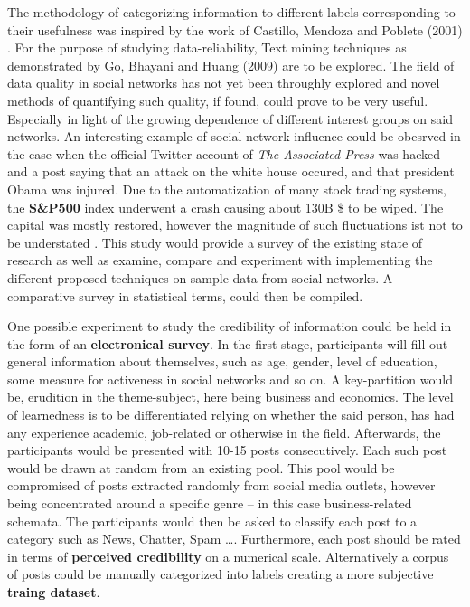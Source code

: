 \documentclass[12pt]{article}
\begin{document}
The methodology of categorizing information to different labels corresponding to their usefulness was inspired by the work of Castillo, Mendoza and Poblete (2001)
\cite{castillo}. For the purpose of studying data-reliability, Text mining techniques as demonstrated by Go, Bhayani and Huang (2009)\cite{go} are to be explored. The field of data quality in social networks has not yet been throughly explored and novel methods of quantifying such quality, if found, could prove to be very useful. Especially in light of the growing dependen{\tiny }ce of different interest groups on said networks. An interesting example of social network influence could be obesrved in the case when the official Twitter account of \textit{ The Associated Press} was hacked and a post saying that an attack on the white house occured, and that president Obama was injured. Due to the automatization of many stock trading systems, the \textbf{ S\&P500} index underwent a crash causing about 130B \$ to be wiped. The capital was mostly restored, however the magnitude of such fluctuations ist not to be understated \cite{hack}. This study would provide a survey of the existing state of research as well as examine, compare and experiment with implementing the different proposed techniques on sample data from social networks. A comparative survey in statistical terms, could then be compiled.
\\
\newpage

One possible experiment to study the credibility of information could be held in the form of an \textbf{electronical survey}. In the first stage, participants will fill out general information about themselves, such as age, gender, level of education, some measure for activeness in social networks and so on. A key-partition would be, erudition in the theme-subject, here being business and economics. The level of learnedness is to be differentiated relying on whether the said person, has had any experience academic, job-related or otherwise in the field. Afterwards, the participants would be presented with 10-15 posts consecutively. Each such post would be drawn at random from an existing pool. This pool would be compromised of posts extracted randomly from social media outlets, however being concentrated around a specific genre – in this case business-related schemata. The participants would then be asked to classify each post to a category such as {News, Chatter, Spam …}. Furthermore, each post should be rated in terms of \textbf{perceived credibility} on a numerical scale.  Alternatively a corpus of posts could be manually categorized into labels creating a more subjective \textbf{traing dataset}.
\\
\end{document}
